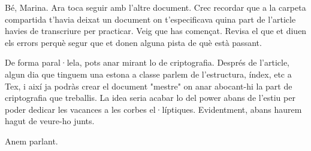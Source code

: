 Bé, Marina. Ara toca seguir amb l'altre document. Crec recordar que a la carpeta compartida t'havia deixat un document on t'especificava quina part de l'article havies de transcriure per practicar. Veig que has començat. Revisa el que et diuen els errors perquè segur que et donen alguna pista de què està passant.

De forma paral·lela, pots anar mirant lo de criptografia. Després de l'article, algun dia que tinguem una estona a classe parlem de l'estructura, índex, etc a Tex, i així ja podràs crear el document "mestre" on anar abocant-hi la part de criptografia que treballis. La idea seria acabar lo del power abans de l'estiu per poder dedicar les vacances a les corbes el·líptiques. Evidentment, abans haurem hagut de veure-ho junts.

Anem parlant.
